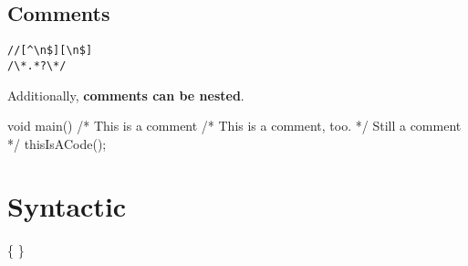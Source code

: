 \section{Comments}
\begin{grammar}
	 \verb|//[^\n$][\n$]| \\
	 \verb|/\*.*?\*/|
\end{grammar}
Additionally, \textbf{comments can be nested}.

\begin{code}
void main() {
	/* This is a comment
		/* This is a comment, too. */
		Still a comment */
	thisIsACode();
}
\end{code}

\chapter{Syntactic}
\begin{grammar}
	  \{   \}
\end{grammar}

